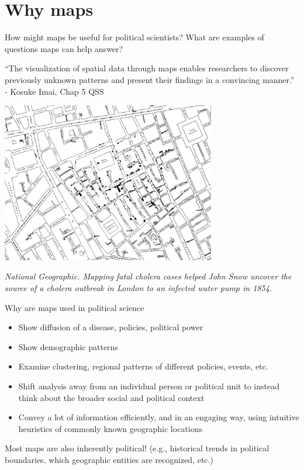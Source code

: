 \documentclass[
  letterpaper,
  DIV=11,
  numbers=noendperiod]{scrreprt}
\providecommand{\tightlist}{%
  \setlength{\itemsep}{0pt}\setlength{\parskip}{0pt}}\usepackage{longtable,booktabs,array}
\begin{document}
\hypertarget{why-maps}{%
\section{Why maps}\label{why-maps}}

How might maps be useful for political scientists? What are examples of
questions maps can help answer?

``The visualization of spatial data through maps enables researchers to
discover previously unknown patterns and present their findings in a
convincing manner.'' - Kosuke Imai, Chap 5 QSS

\includegraphics[width=0.7\textwidth,height=\textheight]{images/snowmap.jpeg}

\emph{National Geographic. Mapping fatal cholera cases helped John Snow
uncover the source of a cholera outbreak in London to an infected water
pump in 1854.}

Why are maps used in political science

\begin{itemize}
\tightlist
\item
  Show diffusion of a disease, policies, political power
\item
  Show demographic patterns
\item
  Examine clustering, regional patterns of different policies, events,
  etc.
\item
  Shift analysis away from an individual person or political unit to
  instead think about the broader social and political context
\item
  Convey a lot of information efficiently, and in an engaging way, using
  intuitive heuristics of commonly known geographic locations
\end{itemize}

Most maps are also inherently political! (e.g., historical trends in
political boundaries, which geographic entities are recognized, etc.)
\end{document}
